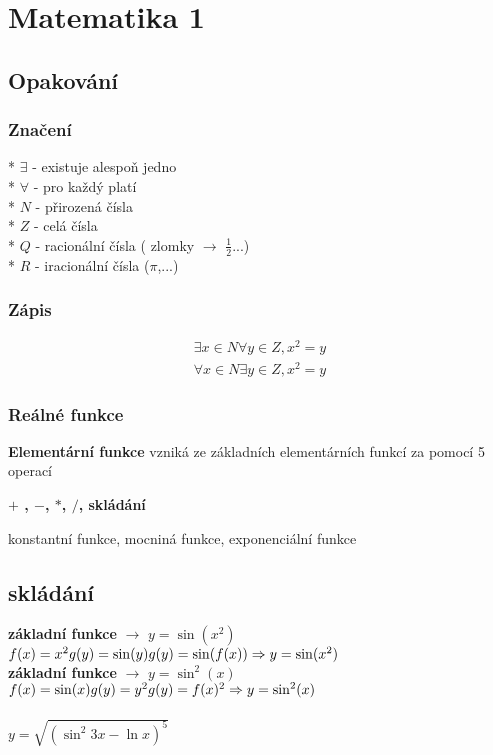 



\section*{Matematika 1}
\subsection*{\textbf{Opakování}}
\subsubsection*{Značení}
* $\exists$ - existuje alespoň jedno \\
* $\forall$ - pro každý platí \\
* $N$ - přirozená čísla \\
* $Z$ - celá čísla \\
* $Q$ - racionální čísla ( zlomky $\rightarrow$ $\frac{1}{2}$...) \\
* $R$ - iracionální čísla ($\pi$,...) 
\subsubsection*{\textbf{Zápis}}
\begin{gather*}    
    \exists x \in N \forall y \in Z,x^2=y \\
    \forall x\in N \exists y \in Z, x^2=y
\end{gather*}
\subsubsection*{\textbf{Reálné funkce}}
\begin{description}
    \item \textbf{Elementární funkce} vzniká ze základních elementárních funkcí za pomocí 5 operací
    \item \textbf{$+$ , $-$, $*$, $/$, skládání}
    \item  konstantní funkce, mocniná funkce, exponenciální funkce
\end{description}

\subsection*{skládání}
\textbf{základní funkce} $\rightarrow$ $y=\sin(x^2)$
$f(x)=x^2 \\
g(y) = \sin(y) \\
g(y)= \sin(f(x)) \Rightarrow y = \sin(x^2)$
\\
\textbf{základní funkce} $\rightarrow$ $y=\sin^2(x)$
$f(x)=\sin(x) \\
g(y) = y^2 \\
g(y)= f(x)^2 \Rightarrow y = \sin^2(x)$
\\\\
$y=\sqrt{(\sin^2{3x-\ln{x}})^5}$
\\
